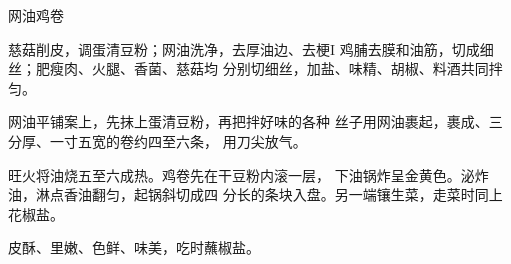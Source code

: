 \begin{recipe}{网油鸡卷}

\ingredients



\cooking

\step 慈菇削皮，调蛋清豆粉；网油洗净，去厚油边、去梗I 鸡脯去膜和油筋，切成细丝；肥瘦肉、火腿、香菌、慈菇均 分别切细丝，加盐、味精、胡椒、料酒共同拌匀。

网油平铺案上，先抹上蛋清豆粉，再把拌好味的各种 丝子用网油裹起，裹成、三分厚、一寸五宽的卷约四至六条， 用刀尖放气。

\step 旺火将油烧五至六成热。鸡卷先在干豆粉内滚一层， 下油锅炸呈金黄色。泌炸油，淋点香油翻匀，起锅斜切成四 分长的条块入盘。另一端镶生菜，走菜时同上花椒盐。

\notes

皮酥、里嫩、色鲜、味美，吃时蘸椒盐。

\end{recipe}

